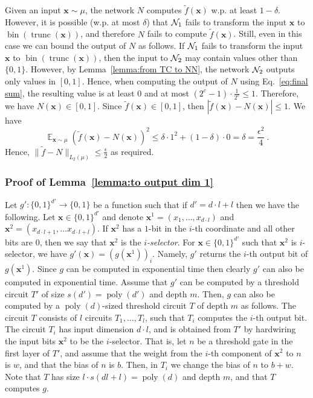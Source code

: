 \documentclass[11pt]{article}
\newcommand{\bx}{\mathbf{x}}
\newcommand{\cn}{{\cal N}}
\DeclareMathOperator{\poly}{poly}
\DeclareMathOperator*{\E}{\mathbb{E}}
\DeclareMathOperator{\bin}{bin}
\DeclareMathOperator{\trunc}{trunc}
\newcommand{\snorm}[1]{\|#1\|} %
\begin{document}
Given an input $\bx \sim \mu$, the network $N$ computes $\tilde{f}(\bx)$ w.p. at least $1-\delta$. However, it is possible (w.p. at most $\delta$) that $\cn_1$ fails to transform the input $\bx$ to $\bin(\trunc(\bx))$, and therefore $N$ fails to compute $\tilde{f}(\bx)$. Still, even in this case we can bound the output of $N$ as follows. If $\cn_1$ fails to transform the input $\bx$ to $\bin(\trunc(\bx))$, then the input to $\cn_2$ may contain values other than $\{0,1\}$. However, by Lemma~\ref{lemma:from TC to NN}, the network $\cn_2$ outputs only values in $[0,1]$. Hence, when computing the output of $N$ using Eq.~\ref{eq:final sum}, the resulting value is at least $0$ and at most $(2^c - 1) \cdot \frac{1}{2^c} \leq 1$.
Therefore, we have $N(\bx) \in [0,1]$. Since $\tilde{f}(\bx) \in [0,1]$, then $|\tilde{f}(\bx) - N(\bx)| \leq 1$. 
We have
\[
\E_{\bx \sim \mu}\left(\tilde{f}(\bx) - N(\bx) \right)^2 \leq \delta \cdot 1^2 + (1-\delta) \cdot 0 = \delta = \frac{\epsilon^2}{4}~.
\]
Hence, $\snorm{\tilde{f}-N}_{L_2(\mu)} \leq \frac{\epsilon}{2}$ as required.

\subsubsection{Proof of Lemma~\ref{lemma:to output dim 1}}
\label{sec:proof of lemma to output dim 1}

Let $g':\{0,1\}^{d'} \rightarrow \{0,1\}$ be a function such that if $d' = d \cdot l + l$ then we have the following. Let $\bx \in \{0,1\}^{d'}$ and denote $\bx^1 = (x_1,\ldots,x_{d \cdot l})$ and $\bx^2 = (x_{d \cdot l+1},\ldots x_{d \cdot l+l})$. If $\bx^2$ has a $1$-bit in the $i$-th coordinate and all other bits are $0$, then we say that $\bx^2$ is the {\em $i$-selector}. For $\bx \in \{0,1\}^{d'}$ such that $\bx^2$ is $i$-selector, we have $g'(\bx)=(g(\bx^1))_i$. Namely, $g'$ returns the $i$-th output bit of $g(\bx^1)$.
Since $g$ can be computed in exponential time then clearly $g'$ can also be computed in exponential time. 
Assume that $g'$ can be computed by a threshold circuit $T'$ of size $s(d')=\poly(d')$ and depth $m$. Then, $g$ can also be computed by a $\poly(d)$-sized threshold circuit $T$ of depth $m$ as follows. The circuit $T$ consists of $l$ circuits $T_1,\ldots,T_l$, such that $T_i$ computes the $i$-th output bit. The circuit $T_i$ has input dimension $d \cdot l$, and is obtained from $T'$ by hardwiring the input bits $\bx^2$ to be the $i$-selector. That is, let $n$ be a threshold gate in the first layer of $T'$, and assume that the weight from the $i$-th component of $\bx^2$ to $n$ is $w$, and that the bias of $n$ is $b$. Then, in $T_i$ we change the bias of $n$ to $b+w$. Note that $T$ has size $l \cdot s(d l + l) = \poly(d)$ and depth $m$, and that $T$ computes $g$.
\end{document}
